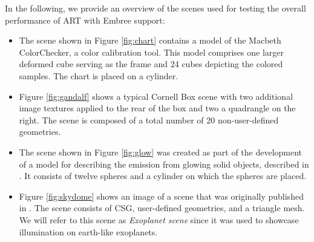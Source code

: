 \noindent In the following, we provide an overview of the scenes used for testing the overall performance of ART with Embree support:
\begin{itemize}
	\setlength\itemsep{0.05em}
	
	\item The scene shown in Figure \ref{fig:chart} contains a model of the Macbeth ColorChecker, a color calibration tool. This model comprises one larger deformed cube serving as the frame and 24 cubes depicting the colored samples. The chart is placed on a cylinder.
	
	\item Figure \ref{fig:gandalf} shows a typical Cornell Box scene with two additional image textures applied to the rear of the box and two a quadrangle on the right. The scene is composed of a total number of 20 non-user-defined geometries.
	
	\item The scene shown in Figure \ref{fig:glow} was created as part of the development of a model for describing the emission from glowing solid objects, described in  \cite{wilkie2011physically}. It consists of twelve spheres and a cylinder on which the spheres are placed.
	
	\item Figure \ref{fig:skydome} shows an image of a scene that was originally published in \cite{wilkie2013predicting}. The scene consists of CSG, user-defined geometries, and a triangle mesh. We will refer to this scene as \emph{Exoplanet scene} since it was used to showcase illumination on earth-like exoplanets.
	
	
\end{itemize}


